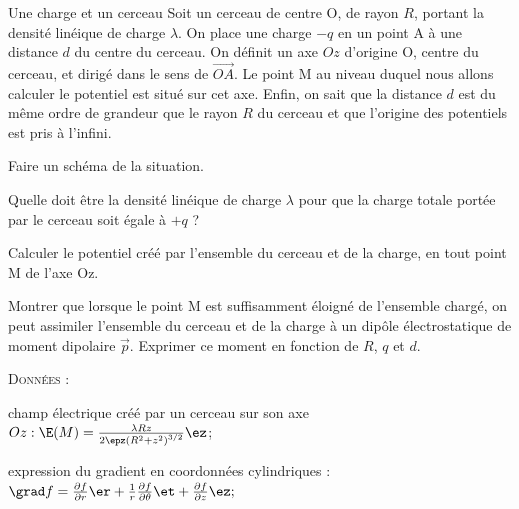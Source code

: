   \begin{exo}[PC][1][colle]{Une charge et un cerceau}
  Soit un cerceau de centre $\mathrm{O}$, de rayon ${R}$, portant la densité linéique de charge $\lambda$. On place une charge $-q$ en un point $\mathrm{A}$ à une distance ${d}$ du centre du cerceau. On définit un axe ${Oz}$ d'origine $\mathrm{O}$, centre du cerceau, et dirigé dans le sens de $\Vec{O A}$. Le point $\mathrm{M}$ au niveau duquel nous allons calculer le potentiel est situé sur cet axe.
  Enfin, on sait que la distance $d$ est du même ordre de grandeur que le rayon ${R}$ du cerceau et que l'origine des potentiels est pris à l'infini.
  \begin{quest}
    \item Faire un schéma de la situation.
    \item Quelle doit être la densité linéique de charge $\lambda$ pour que la charge totale portée par le cerceau soit égale à $+{q}$ ?
    \item Calculer le potentiel créé par l'ensemble du cerceau et de la charge, en tout point $\mathrm{M}$ de l'axe $\mathrm{Oz}$.
    \item Montrer que lorsque le point $\mathrm{M}$ est suffisamment éloigné de l'ensemble chargé, on peut assimiler l'ensemble du cerceau et de la charge à un dipôle électrostatique de moment dipolaire $\Vec{p}$.
    Exprimer ce moment en fonction de ${R}$, $q$ et ${d}$.
  \end{quest}
    \textsc{Données} :
    \begin{liste}
      \item
      champ électrique créé par un cerceau sur son axe ${Oz}: \E(M)=\frac{\lambda R z}{2 \epz \left(R^2+z^2\right)^{3/2}} \ez$;
      \item expression du gradient en coordonnées cylindriques :
      $
      \grad f=\frac{\partial f}{\partial r} \er+\frac{1}{r} \frac{\partial f}{\partial \theta} \et+\frac{\partial f}{\partial z} \ez;
      $
    \end{liste}
  \end{exo}
  
